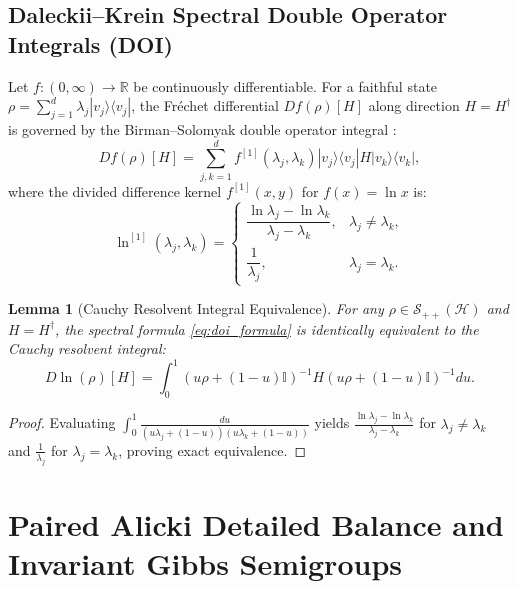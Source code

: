 \documentclass[11pt,a4paper]{article}
\theoremstyle{plain}
\newtheorem{lemma}[theorem]{Lemma}
\theoremstyle{definition}
\begin{document}
\subsection{Daleckii--Krein Spectral Double Operator Integrals (DOI)}
Let $f: (0, \infty) \to \mathbb{R}$ be continuously differentiable. For a faithful state $\rho = \sum_{j=1}^d \lambda_j |v_j\rangle\langle v_j|$, the Fr\'{e}chet differential $Df(\rho)[H]$ along direction $H = H^\dagger$ is governed by the Birman--Solomyak double operator integral \cite{DaleckiiKrein1956,BirmanSolomyak2003,Bhatia1997}:
\begin{equation}
Df(\rho)[H] = \sum_{j,k=1}^d f^{[1]}(\lambda_j, \lambda_k) |v_j\rangle\langle v_j| H |v_k\rangle\langle v_k|,
\label{eq:doi_formula}
\end{equation}
where the divided difference kernel $f^{[1]}(x, y)$ for $f(x) = \ln x$ is:
\begin{equation}
\ln^{[1]}(\lambda_j, \lambda_k) = \begin{cases}
\dfrac{\ln\lambda_j - \ln\lambda_k}{\lambda_j - \lambda_k}, & \lambda_j \neq \lambda_k, \\
\dfrac{1}{\lambda_j}, & \lambda_j = \lambda_k.
\end{cases}
\label{eq:log_divided_diff}
\end{equation}

\begin{lemma}[Cauchy Resolvent Integral Equivalence]
For any $\rho \in \mathcal{S}_{++}(\mathcal{H})$ and $H = H^\dagger$, the spectral formula \eqref{eq:doi_formula} is identically equivalent to the Cauchy resolvent integral:
\begin{equation}
D\ln(\rho)[H] = \int_0^1 \left(u\rho + (1-u)\mathbb{I}\right)^{-1} H \left(u\rho + (1-u)\mathbb{I}\right)^{-1} du.
\label{eq:cauchy_resolvent_lemma}
\end{equation}
\end{lemma}
\begin{proof}
Evaluating $\int_0^1 \frac{du}{(u\lambda_j + (1-u))(u\lambda_k + (1-u))}$ yields $\frac{\ln\lambda_j - \ln\lambda_k}{\lambda_j - \lambda_k}$ for $\lambda_j \neq \lambda_k$ and $\frac{1}{\lambda_j}$ for $\lambda_j = \lambda_k$, proving exact equivalence.
\end{proof}

\section{Paired Alicki Detailed Balance and Invariant Gibbs Semigroups}
\end{document}
